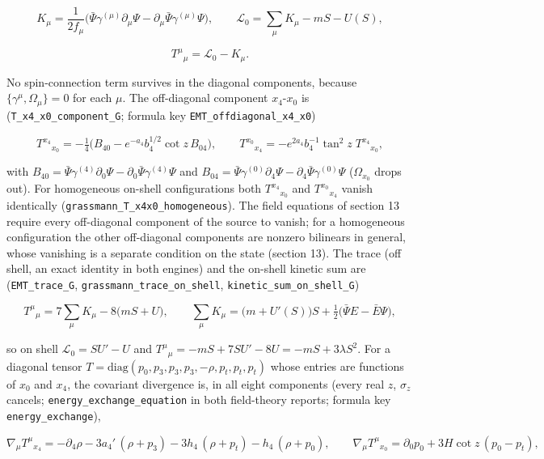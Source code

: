 \documentclass[11pt]{article}
\begin{document}
\[
K_\mu = \frac{1}{2f_\mu}\big(\bar\Psi\gamma^{(\mu)}\partial_\mu\Psi - \partial_\mu\bar\Psi\gamma^{(\mu)}\Psi\big),\qquad \mathcal{L}_0 = \sum_\mu K_\mu - mS - U(S),
\]

\[
T^\mu{}_\mu = \mathcal{L}_0 - K_\mu .
\]

No spin-connection term survives in the diagonal components, because $\{\gamma^\mu, \Omega_\mu\} = 0$ for each $\mu$. The off-diagonal component $x_4$-$x_0$ is (\texttt{T\_x4\_x0\_\allowbreak{}componen\allowbreak{}t\_G}; formula key \texttt{EMT\_offd\allowbreak{}iagonal\_\allowbreak{}x4\_x0})

\[
T^{x_4}{}_{x_0} = -\tfrac14\big(B_{40} - e^{-a_4}b_4^{1/2}\cot z\,B_{04}\big),\qquad T^{x_0}{}_{x_4} = -e^{2a_4}b_4^{-1}\tan^2 z\;T^{x_4}{}_{x_0},
\]

with $B_{40} = \bar\Psi\gamma^{(4)}\partial_0\Psi - \partial_0\bar\Psi\gamma^{(4)}\Psi$ and $B_{04} = \bar\Psi\gamma^{(0)}\partial_4\Psi - \partial_4\bar\Psi\gamma^{(0)}\Psi$ ($\Omega_{x_0}$ drops out). For homogeneous on-shell configurations both $T^{x_4}{}_{x_0}$ and $T^{x_0}{}_{x_4}$ vanish identically (\texttt{grassman\allowbreak{}n\_T\_x4x0\allowbreak{}\_homogen\allowbreak{}eous}). The field equations of section 13 require every off-diagonal component of the source to vanish; for a homogeneous configuration the other off-diagonal components are nonzero bilinears in general, whose vanishing is a separate condition on the state (section 13). The trace (off shell, an exact identity in both engines) and the on-shell kinetic sum are (\texttt{EMT\_trac\allowbreak{}e\_G}, \texttt{grassman\allowbreak{}n\_trace\_\allowbreak{}on\_shell}, \texttt{kinetic\_\allowbreak{}sum\_on\_s\allowbreak{}hell\_G})

\[
T^\mu{}_\mu = 7\sum_\mu K_\mu - 8\big(mS + U\big),\qquad \sum_\mu K_\mu = \big(m + U'(S)\big)S + \tfrac12\big(\bar\Psi E - \bar E\Psi\big),
\]

so on shell $\mathcal{L}_0 = SU' - U$ and $T^\mu{}_\mu = -mS + 7SU' - 8U = -mS + 3\lambda S^2$. For a diagonal tensor $T = \mathrm{diag}(p_0, p_3, p_3, p_3, -\rho, p_t, p_t, p_t)$ whose entries are functions of $x_0$ and $x_4$, the covariant divergence is, in all eight components (every real $z$, $\sigma_z$ cancels; \texttt{energy\_e\allowbreak{}xchange\_\allowbreak{}equation} in both field-theory reports; formula key \texttt{energy\_e\allowbreak{}xchange}),

\[
\nabla_\mu T^\mu{}_{x_4} = -\partial_4\rho - 3a_4'\,(\rho + p_3) - 3h_4\,(\rho + p_t) - h_4\,(\rho + p_0),\qquad \nabla_\mu T^\mu{}_{x_0} = \partial_0 p_0 + 3H\cot z\,(p_0 - p_t),
\]
\end{document}
